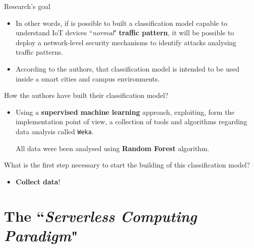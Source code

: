 \documentclass[13.5pt]{beamer}
\begin{document}
\begin{frame}{Research's goal}

\begin{itemize}
\justifying
\item In other words, if is possible to built a classification model capable to understand IoT devices ``\textit{normal}" \textbf{traffic pattern}, it will be possible to deploy a network-level security mechanisms to identify attacks analysing traffic patterns.

\item According to the authors, that classification model is intended to be used inside a smart cities and campus environments.
\end{itemize}

\begin{alertblock}{}
\justifying
How the authors have built their classification model?
\end{alertblock}

\begin{itemize}
\justifying
\item Using a \textbf{supervised machine learning} approach, exploiting, form the implementation point of view, a collection of tools and algorithms regarding data analysis called \texttt{Weka}.

All data were been analysed using \textbf{Random Forest} algorithm.
\end{itemize}

\begin{alertblock}{}
\justifying
What is the first step necessary to start the building of this classification model?
\end{alertblock}

\begin{itemize}
\item \textbf{Collect data}!
\end{itemize}

\end{frame} 
\section{The ``\textit{Serverless Computing Paradigm}"}
\end{document}
